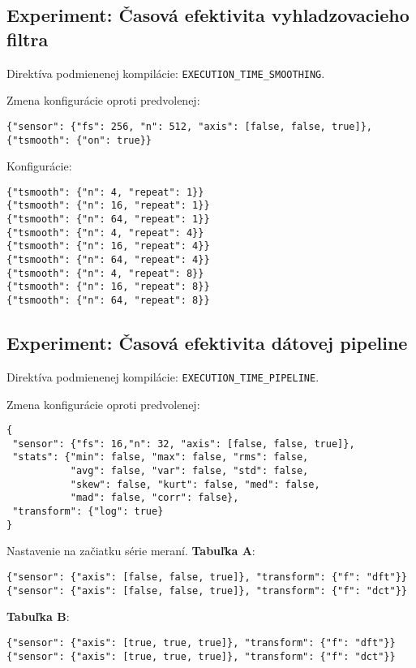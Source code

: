 \subsection*{Experiment: Časová efektivita vyhladzovacieho filtra}
\noindent Direktíva podmienenej kompilácie: \verb|EXECUTION_TIME_SMOOTHING|.

\noindent Zmena konfigurácie oproti predvolenej:
\begin{lstlisting}[style=experiments]
{"sensor": {"fs": 256, "n": 512, "axis": [false, false, true]},  {"tsmooth": {"on": true}}
\end{lstlisting}

\noindent Konfigurácie:
\begin{lstlisting}[style=experiments]
{"tsmooth": {"n": 4, "repeat": 1}}
{"tsmooth": {"n": 16, "repeat": 1}}
{"tsmooth": {"n": 64, "repeat": 1}}
{"tsmooth": {"n": 4, "repeat": 4}}
{"tsmooth": {"n": 16, "repeat": 4}}
{"tsmooth": {"n": 64, "repeat": 4}}
{"tsmooth": {"n": 4, "repeat": 8}}
{"tsmooth": {"n": 16, "repeat": 8}}
{"tsmooth": {"n": 64, "repeat": 8}}
\end{lstlisting}


\subsection*{Experiment: Časová efektivita dátovej pipeline}
\noindent Direktíva podmienenej kompilácie: \verb|EXECUTION_TIME_PIPELINE|.

\noindent Zmena konfigurácie oproti predvolenej:
\begin{lstlisting}[style=messages]
{
 "sensor": {"fs": 16,"n": 32, "axis": [false, false, true]}, 
 "stats": {"min": false, "max": false, "rms": false, 
 		   "avg": false, "var": false, "std": false, 
 		   "skew": false, "kurt": false, "med": false, 
 		   "mad": false, "corr": false},
 "transform": {"log": true}
}
\end{lstlisting}

\noindent Nastavenie na začiatku série meraní. \textbf{Tabuľka A}:
\begin{lstlisting}[style=experiments]
{"sensor": {"axis": [false, false, true]}, "transform": {"f": "dft"}}
{"sensor": {"axis": [false, false, true]}, "transform": {"f": "dct"}}
\end{lstlisting}

\textbf{Tabuľka B}:
\begin{lstlisting}[style=experiments]
{"sensor": {"axis": [true, true, true]}, "transform": {"f": "dft"}}
{"sensor": {"axis": [true, true, true]}, "transform": {"f": "dct"}}
\end{lstlisting}

